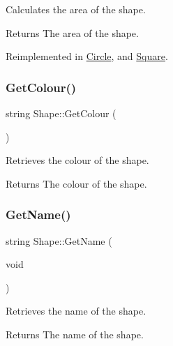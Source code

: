 Calculates the area of the shape. 

\begin{DoxyReturn}{Returns}
The area of the shape. 
\end{DoxyReturn}


Reimplemented in \mbox{\hyperlink{class_circle_ae720283333ec4b0336f3ad6ff8bf20ce}{Circle}}, and \mbox{\hyperlink{class_square_a514f98666ebe6c9d43bc454e3d5819a4}{Square}}.

\mbox{\label{class_shape_ada61754901b5db24dad569c5a54a567b}} 
\subsubsection{\texorpdfstring{GetColour()}{GetColour()}}
{\footnotesize\ttfamily string Shape\+::\+Get\+Colour (\begin{DoxyParamCaption}{ }\end{DoxyParamCaption})}



Retrieves the colour of the shape. 

\begin{DoxyReturn}{Returns}
The colour of the shape. 
\end{DoxyReturn}
\mbox{\label{class_shape_a7af8e23f8cce0f52e526b45b45818917}} 
\subsubsection{\texorpdfstring{GetName()}{GetName()}}
{\footnotesize\ttfamily string Shape\+::\+Get\+Name (\begin{DoxyParamCaption}\item[{void}]{ }\end{DoxyParamCaption})}



Retrieves the name of the shape. 

\begin{DoxyReturn}{Returns}
The name of the shape. 
\end{DoxyReturn}
\mbox{\label{class_shape_a60aea90f45ea0f6d60cd749918728e16}} 
